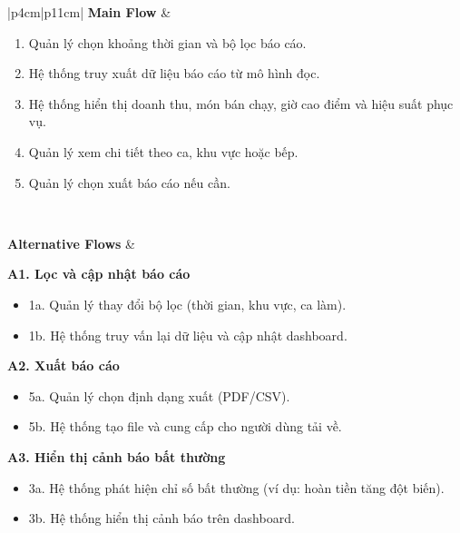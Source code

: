 \begin{longtable}{|p{4cm}|p{11cm}|}
\textbf{Main Flow} &
\begin{minipage}[t]{\linewidth}
\vspace{0.3mm}
\begin{enumerate}
\item Quản lý chọn khoảng thời gian và bộ lọc báo cáo.
\item Hệ thống truy xuất dữ liệu báo cáo từ mô hình đọc.
\item Hệ thống hiển thị doanh thu, món bán chạy, giờ cao điểm và hiệu suất phục vụ.
\item Quản lý xem chi tiết theo ca, khu vực hoặc bếp.
\item Quản lý chọn xuất báo cáo nếu cần.
\end{enumerate}
\vspace{0.3mm}
\end{minipage}
\\ \hline

\textbf{Alternative Flows} &
\begin{minipage}[t]{\linewidth}
\vspace{0.3mm}

\textbf{A1. Lọc và cập nhật báo cáo}
\begin{itemize}
\item 1a. Quản lý thay đổi bộ lọc (thời gian, khu vực, ca làm).
\item 1b. Hệ thống truy vấn lại dữ liệu và cập nhật dashboard.
\end{itemize}

\vspace{0.3mm}

\textbf{A2. Xuất báo cáo}
\begin{itemize}
\item 5a. Quản lý chọn định dạng xuất (PDF/CSV).
\item 5b. Hệ thống tạo file và cung cấp cho người dùng tải về.
\end{itemize}

\vspace{0.3mm}

\textbf{A3. Hiển thị cảnh báo bất thường}
\begin{itemize}
\item 3a. Hệ thống phát hiện chỉ số bất thường (ví dụ: hoàn tiền tăng đột biến).
\item 3b. Hệ thống hiển thị cảnh báo trên dashboard.
\end{itemize}

\vspace{0.3mm}
\end{minipage}
\\ \hline


\end{longtable}
